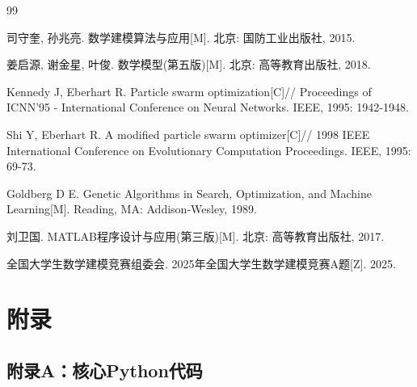 \documentclass[12pt,a4paper]{article}
\begin{document}
\newpage
\begin{thebibliography}{99}

司守奎, 孙兆亮. 数学建模算法与应用[M]. 北京: 国防工业出版社, 2015.

姜启源, 谢金星, 叶俊. 数学模型(第五版)[M]. 北京: 高等教育出版社, 2018.

Kennedy J, Eberhart R. Particle swarm optimization[C]// Proceedings of ICNN'95 - International Conference on Neural Networks. IEEE, 1995: 1942-1948.

Shi Y, Eberhart R. A modified particle swarm optimizer[C]// 1998 IEEE International Conference on Evolutionary Computation Proceedings. IEEE, 1995: 69-73.

Goldberg D E. Genetic Algorithms in Search, Optimization, and Machine Learning[M]. Reading, MA: Addison-Wesley, 1989.

刘卫国. MATLAB程序设计与应用(第三版)[M]. 北京: 高等教育出版社, 2017.

全国大学生数学建模竞赛组委会. 2025年全国大学生数学建模竞赛A题[Z]. 2025.

\end{thebibliography}


\newpage
\appendix
\section{附录}

\subsection{附录A：核心Python代码}
\end{document}
